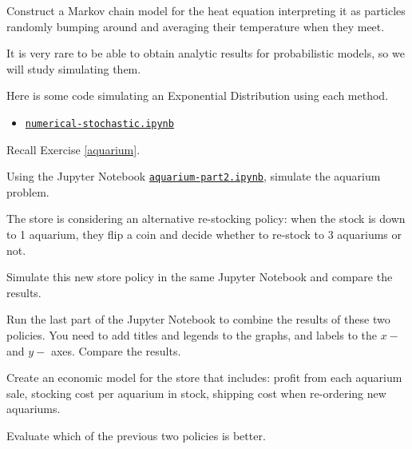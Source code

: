 \begin{slide}
\question

Construct a Markov chain model for the heat equation interpreting it as particles randomly bumping around and averaging their temperature when they meet.

	
\end{slide}




\begin{slide}
\question
\begin{problem}
It is very rare to be able to obtain analytic results for probabilistic models, so we will study simulating them.
\end{problem}



Here is some code simulating an Exponential Distribution using each method.
\begin{itemize}
	\item \href{https://utoronto.syzygy.ca/jupyter/user-redirect/git-pull?repo=https://github.com/bigfatbernie/IBLMathModeling&subPath=book/python/numerical-stochastic.ipynb}{\tt numerical-stochastic.ipynb}
\end{itemize}

	
\end{slide}



\begin{slide}
\question \label{aquarium2}

Recall Exercise \ref{aquarium}. 

\begin{parts}
	\item Using the Jupyter Notebook 	\href{https://utoronto.syzygy.ca/jupyter/user-redirect/git-pull?repo=https://github.com/bigfatbernie/IBLMathModeling&subPath=book/python/aquarium-part2.ipynb}{\tt aquarium-part2.ipynb}, simulate the aquarium problem.

	\item The store is considering an alternative re-stocking policy: when the stock is down to 1 aquarium, they flip a coin and decide whether to re-stock to 3 aquariums or not.
	
	Simulate this new store policy in the same Jupyter Notebook and compare the results.
	
	\item Run the last part of the Jupyter Notebook to combine the results of these two policies. You need to add titles and legends to the graphs, and labels to the $x-$ and $y-$ axes. Compare the results.

	\item \label{aquarium2:economic} Create an economic model for the store that includes: profit from each aquarium sale, stocking cost per aquarium in stock, shipping cost when re-ordering new aquariums.
	
		Evaluate which of the previous two policies is better. 
\end{parts}

\end{slide}


